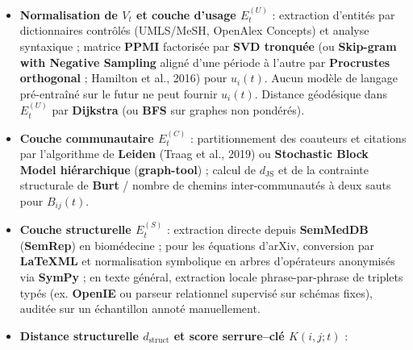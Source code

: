 \documentclass[a4paper,11pt]{article}
\providecommand{\tightlist}{\setlength{\itemsep}{0pt}\setlength{\parskip}{0pt}}
\begin{document}
\begin{itemize}
\tightlist
\item
  \textbf{Normalisation de \(V_t\) et couche d'usage \(E_t^{(U)}\)} :
  extraction d'entités par dictionnaires contrôlés (UMLS/MeSH, OpenAlex
  Concepts) et analyse syntaxique ; matrice \textbf{PPMI} factorisée par
  \textbf{SVD tronquée} (ou \textbf{Skip-gram with Negative Sampling}
  aligné d'une période à l'autre par \textbf{Procrustes orthogonal} ;
  Hamilton et al., 2016) pour \(u_i(t)\). Aucun modèle de langage
  pré-entraîné sur le futur ne peut fournir \(u_i(t)\). Distance
  géodésique dans \(E_t^{(U)}\) par \textbf{Dijkstra} (ou \textbf{BFS}
  sur graphes non pondérés).
\item
  \textbf{Couche communautaire \(E_t^{(C)}\)} : partitionnement des
  coauteurs et citations par l'algorithme de \textbf{Leiden} (Traag et
  al., 2019) ou \textbf{Stochastic Block Model hiérarchique}
  (\textbf{graph-tool}) ; calcul de \(d_{\mathrm{JS}}\) et de la
  contrainte structurale de \textbf{Burt} / nombre de chemins
  inter-communautés à deux sauts pour \(B_{ij}(t)\).
\item
  \textbf{Couche structurelle \(E_t^{(S)}\)} : extraction directe depuis
  \textbf{SemMedDB} (\textbf{SemRep}) en biomédecine ; pour les
  équations d'arXiv, conversion par \textbf{LaTeXML} et normalisation
  symbolique en arbres d'opérateurs anonymisés via \textbf{SymPy} ; en
  texte général, extraction locale phrase-par-phrase de triplets typés
  (ex. \textbf{OpenIE} ou parseur relationnel supervisé sur schémas
  fixes), auditée sur un échantillon annoté manuellement.
\item
  \textbf{Distance structurelle \(d_{\mathrm{struct}}\) et score
  serrure--clé \(K(i,j;t)\)} :


\end{itemize}
\end{document}
